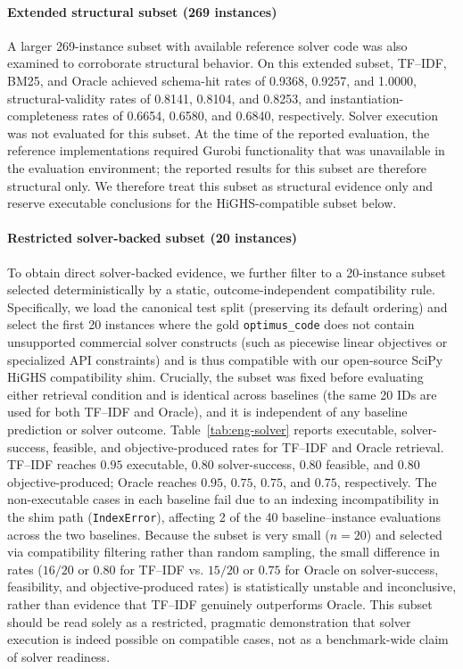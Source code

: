 \documentclass[3p]{elsarticle}
\begin{document}
\paragraph{Extended structural subset (269 instances)} A larger 269-instance subset with available reference solver code was also examined to corroborate structural behavior. On this extended subset, TF--IDF, BM25, and Oracle achieved schema-hit rates of 0.9368, 0.9257, and 1.0000, structural-validity rates of 0.8141, 0.8104, and 0.8253, and instantiation-completeness rates of 0.6654, 0.6580, and 0.6840, respectively. Solver execution was not evaluated for this subset. At the time of the reported evaluation, the reference implementations required Gurobi functionality that was unavailable in the evaluation environment; the reported results for this subset are therefore structural only. We therefore treat this subset as structural evidence only and reserve executable conclusions for the HiGHS-compatible subset below.

\paragraph{Restricted solver-backed subset (20 instances)} To obtain direct solver-backed evidence, we further filter to a 20-instance subset selected deterministically by a static, outcome-independent compatibility rule. Specifically, we load the canonical test split (preserving its default ordering) and select the first 20 instances where the gold \texttt{optimus\_code} does not contain unsupported commercial solver constructs (such as piecewise linear objectives or specialized API constraints) and is thus compatible with our open-source SciPy HiGHS compatibility shim. Crucially, the subset was fixed before evaluating either retrieval condition and is identical across baselines (the same 20 IDs are used for both TF--IDF and Oracle), and it is independent of any baseline prediction or solver outcome. Table~\ref{tab:eng-solver} reports executable, solver-success, feasible, and objective-produced rates for TF--IDF and Oracle retrieval. TF--IDF reaches $0.95$ executable, $0.80$ solver-success, $0.80$ feasible, and $0.80$ objective-produced; Oracle reaches $0.95$, $0.75$, $0.75$, and $0.75$, respectively. The non-executable cases in each baseline fail due to an indexing incompatibility in the shim path (\texttt{IndexError}), affecting 2 of the 40 baseline--instance evaluations across the two baselines. Because the subset is very small ($n=20$) and selected via compatibility filtering rather than random sampling, the small difference in rates ($16/20$ or $0.80$ for TF--IDF vs. $15/20$ or $0.75$ for Oracle on solver-success, feasibility, and objective-produced rates) is statistically unstable and inconclusive, rather than evidence that TF--IDF genuinely outperforms Oracle. This subset should be read solely as a restricted, pragmatic demonstration that solver execution is indeed possible on compatible cases, not as a benchmark-wide claim of solver readiness.
\end{document}
